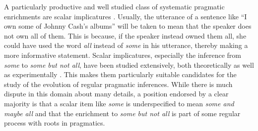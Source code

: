 \documentclass[a4paper, 11pt]{article}
\theoremstyle{Satz}
\begin{document}
A particularly productive and well studied class of systematic pragmatic enrichments are scalar
implicatures
\citep{horn:1984,Hirschberg1985:A-Theory-of-Sca,LevinsonPragmatics1983,Geurts2010:Quantity-Implic}. Usually,
the utterance of a sentence like ``I own some of Johnny Cash's albums'' will be taken to mean
that the speaker does not own all of them. This is because, if the speaker instead owned them all, she
could have used the word \emph{all} instead of \emph{some} in his utterance, thereby making a
more informative statement. Scalar implicatures, especially the inference from \emph{some} to
\emph{some but not all}, have been studied extensively, both theoretically
\citep[e.g.,][]{Sauerland2004:Scalar-Implicat,ChierchiaFox2008:The-Grammatical,Rooyvan-RooijJagerde-Jager2012:Explaining-Quan}
as well as experimentally
\citep[e.g.,][]{BottNoveck2004:Some-Utterances,huang+snedeker:2009,GrodnerKlein2010:Some-and-Possib,GoodmanStuhlmuller2013:Knowledge-and-I,DegenTanenhaus2012:Processing-Scal}. This makes them particularly suitable candidates for the study of the evolution of regular pragmatic inferences.  While there is much dispute in this domain about many details, a position endorsed by a clear majority is that a scalar item like \emph{some} is underspecified to mean \emph{some and maybe all} and that the enrichment to \emph{some but not all} is part of some regular process with
roots in pragmatics.
\end{document}
